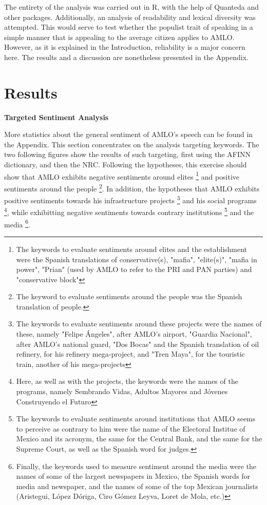\documentclass[]{article}
\begin{document}
The entirety of the analysis was carried out in R, with the help of Quanteda \cite{quanteda2018} and other packages. Additionally, an analysis of readability and lexical diversity was attempted. This would serve to test whether the populist trait of speaking in a simple manner that is appealing to the average citizen applies to AMLO. However, as it is explained in the Introduction, reliability is a major concern here. The results and a discussion are nonetheless presented in the Appendix. 

\section{Results}

\vspace{.5cm}
\noindent\textbf{Targeted Sentiment Analysis}
\vspace{.5cm}

\noindent 

More statistics about the general sentiment of AMLO's speech can be found in the Appendix. This section concentrates on the analysis targeting keywords. The two following figures show the results of such targeting, first using the AFINN dictionary, and then the NRC. Following the hypotheses, this exercise should show that AMLO exhibits negative sentiments around elites
\footnote{The keywords to evaluate sentiments around elites and the establishment were the Spanish translations of conservative(s), "mafia", "elite(s)", "mafia in power", "Prian" (used by AMLO to refer to the PRI and PAN parties) and "conservative block"} 
and positive sentiments around the people
\footnote{The keyword to evaluate sentiments around the people was the Spanish translation of people.}. 
In addition, the hypotheses that AMLO exhibits positive sentiments towards his infrastructure projects
\footnote{The keywords to evaluate sentiments around these projects were the names of these, namely "Felipe Ángeles", after AMLO's airport, "Guardia Nacional", after AMLO's national guard, "Dos Bocas" and the Spanish translation of oil refinery, for his refinery mega-project, and "Tren Maya", for the touristic train, another of his mega-projects} 
and his social programs
\footnote{Here, as well as with the projects, the keywords were the names of the programs, namely Sembrando Vidas, Adultos Mayores and Jóvenes Construyendo el Futuro}, 
while exhibitting negative sentiments towards contrary institutions
\footnote{The keywords to evaluate sentiments around institutions that AMLO seems to perceive as contrary to him were the name of the Electoral Institue of Mexico and its acronym, the same for the Central Bank, and the same for the Supreme Court, as well as the Spanish word for judges.} 
and the media
\footnote{Finally, the keywords used to measure sentiment around the media were the names of some of the largest newspapers in Mexico, the Spanish words for media and newspaper, and the names of some of the top Mexican journalists (Aristegui, López Dóriga, Ciro Gómez Leyva, Loret de Mola, etc.)}. 
\end{document}
